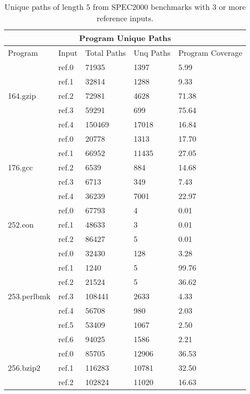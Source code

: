 \begin{table}[t!]
\center
\begin{tabular}{|l|l|l|l|l|}
\hline
\multicolumn{5}{|c|}{Program Unique Paths}\\
\hline
    Program&Input&Total Paths&Unq Paths&Program Coverage\\
\hline\hline
\multirow{5}{*}{164.gzip}
    &ref.0&71935&1397&5.99\\
    &ref.1&32814&1288&9.33\\
    &ref.2&72981&4628&71.38\\
    &ref.3&59291&699&75.64\\
    &ref.4&150469&17018&16.84\\
\hline\hline
\multirow{5}{*}{176.gcc}
    &ref.0&20778&1313&17.70\\
    &ref.1&66952&11435&27.05\\
    &ref.2&6539&884&14.68\\
    &ref.3&6713&349&7.43\\
    &ref.4&36239&7001&22.97\\
\hline\hline
\multirow{3}{*}{252.eon}
    &ref.0&67793&4&0.01\\
    &ref.1&48633&3&0.01\\
    &ref.2&86427&5&0.01\\
\hline\hline
\multirow{7}{*}{253.perlbmk}
    &ref.0&32430&128&3.28\\
    &ref.1&1240&5&99.76\\
    &ref.2&21524&5&36.62\\
    &ref.3&108441&2633&4.33\\
    &ref.4&56708&980&2.03\\
    &ref.5&53409&1067&2.50\\
    &ref.6&94025&1586&2.21\\
\hline\hline
\multirow{3}{*}{256.bzip2}
    &ref.0&85705&12906&36.53\\
    &ref.1&116283&10781&32.50\\
    &ref.2&102824&11020&16.63\\
\hline
\end{tabular}
\caption{Unique paths of length 5 from SPEC2000 benchmarks with 3 or more
reference inputs.}
\label{table:input_id_path}
\end{table}

